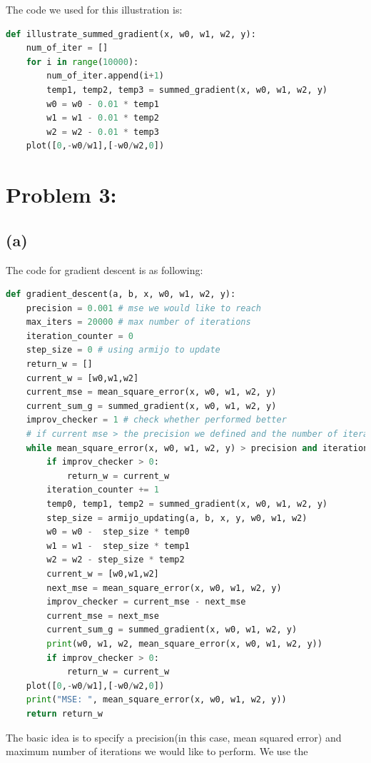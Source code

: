 \documentclass[12pt]{article}
\begin{document}
The code we used for this illustration is: 
\begin{lstlisting}[language=Python, caption=Illustration of the Change of Gradient]
def illustrate_summed_gradient(x, w0, w1, w2, y):
    num_of_iter = []
    for i in range(10000):
        num_of_iter.append(i+1)
        temp1, temp2, temp3 = summed_gradient(x, w0, w1, w2, y)
        w0 = w0 - 0.01 * temp1
        w1 = w1 - 0.01 * temp2
        w2 = w2 - 0.01 * temp3
    plot([0,-w0/w1],[-w0/w2,0])
\end{lstlisting}

\section*{Problem 3: }
\subsection*{(a)}
The code for gradient descent is as following: 
\begin{lstlisting}[language=Python, caption=Gradient Descent]
def gradient_descent(a, b, x, w0, w1, w2, y): 
    precision = 0.001 # mse we would like to reach
    max_iters = 20000 # max number of iterations
    iteration_counter = 0
    step_size = 0 # using armijo to update
    return_w = []
    current_w = [w0,w1,w2]
    current_mse = mean_square_error(x, w0, w1, w2, y)
    current_sum_g = summed_gradient(x, w0, w1, w2, y)
    improv_checker = 1 # check whether performed better
    # if current mse > the precision we defined and the number of iteration does not exceed the max iteration execute the gradient descent
    while mean_square_error(x, w0, w1, w2, y) > precision and iteration_counter < max_iters:
        if improv_checker > 0:
            return_w = current_w
        iteration_counter += 1
        temp0, temp1, temp2 = summed_gradient(x, w0, w1, w2, y)
        step_size = armijo_updating(a, b, x, y, w0, w1, w2)
        w0 = w0 -  step_size * temp0
        w1 = w1 -  step_size * temp1
        w2 = w2 - step_size * temp2
        current_w = [w0,w1,w2]
        next_mse = mean_square_error(x, w0, w1, w2, y)
        improv_checker = current_mse - next_mse
        current_mse = next_mse
        current_sum_g = summed_gradient(x, w0, w1, w2, y)
        print(w0, w1, w2, mean_square_error(x, w0, w1, w2, y))
        if improv_checker > 0:
            return_w = current_w
    plot([0,-w0/w1],[-w0/w2,0])
    print("MSE: ", mean_square_error(x, w0, w1, w2, y))
    return return_w
\end{lstlisting}
The basic idea is to specify a precision(in this case, mean squared error) and maximum number of iterations we would like to perform. We use the 
\end{document}
